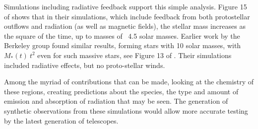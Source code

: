 \documentclass[../dissertation.tex]{subfiles}
\begin{document}
Simulations including radiative feedback support this simple analysis. 
Figure 15 of  \citet{2014MNRAS.439.3420M} shows that in their simulations, 
which include feedback from both protostellar outflows and radiation (as well as magnetic fields), 
the stellar mass increases as the square of the time, up to masses of ~4.5 solar masses. 
Earlier work by the Berkeley group found similar results, forming stars with 10 solar masses, 
with $M_*(t)~ t^2$ even for such massive stars, see Figure 13 of \citet{2012ApJ...754...71K}. 
Their simulations included radiative effects, but no proto-stellar winds. 

Among the myriad of contributions that can be made, looking at the chemistry of these regions, 
creating predictions about the species, the type and amount of emission and absorption of radiation that may be seen. 
The generation of synthetic observations from these simulations would allow more accurate testing by the latest generation of telescopes.
\end{document}

